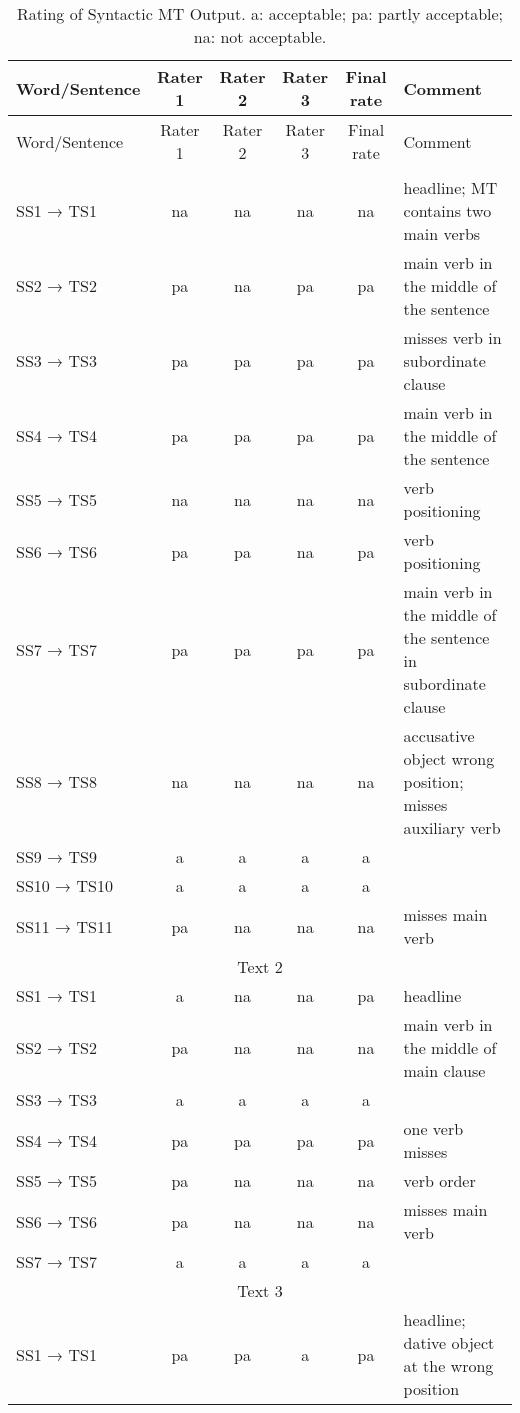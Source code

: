 {\footnotesize\begin{longtable}{l *{4}{c} p{3.75cm}}
\caption{Rating of Syntactic MT Output. a: acceptable; pa: partly acceptable; na: not acceptable.\label{tab:C:1}}\\
\lsptoprule
 Word\slash Sentence & Rater 1 & Rater 2 & Rater 3 & Final rate & Comment\\
\midrule\endfirsthead
\midrule
 Word\slash Sentence & Rater 1 & Rater 2 & Rater 3 & Final rate & Comment\\
 \midrule\endhead
\lspbottomrule\endlastfoot
\multicolumn{6}{c}{Text 1}\\
\midrule
 SS1 → TS1 & na & na & na & na & headline; MT contains two main verbs\\
 SS2 → TS2 & pa & na & pa & pa & main verb in the middle of the sentence\\
 SS3 → TS3 & pa & pa & pa & pa & misses verb in subordinate clause\\
 SS4 → TS4 & pa & pa & pa & pa & main verb in the middle of the sentence\\
 SS5 → TS5 & na & na & na & na & verb positioning\\
 SS6 → TS6 & pa & pa & na & pa & verb positioning\\
 SS7 → TS7 & pa & pa & pa & pa & main verb in the middle of the sentence in subordinate clause\\
 SS8 → TS8 & na & na & na & na & accusative object wrong position; misses auxiliary verb\\
 SS9 → TS9 & a & a & a & a & \\
 SS10 → TS10 & a & a & a & a & \\
 SS11 → TS11 & pa & na & na & na & misses main verb\\
 \midrule
\multicolumn{6}{c}{Text 2}\\
\midrule
 SS1 → TS1 & a & na & na & pa & headline\\
 SS2 → TS2 & pa & na & na & na & main verb in the middle of main clause\\
 SS3 → TS3 & a & a & a & a & \\
 SS4 → TS4 & pa & pa & pa & pa & one verb misses\\
 SS5 → TS5 & pa & na & na & na & verb order\\
 SS6 → TS6 & pa & na & na & na & misses main verb\\
 SS7 → TS7 & a & a & a & a & \\
 \midrule
\multicolumn{6}{c}{Text 3}\\
\midrule
 SS1 → TS1 & pa & pa & a & pa & headline; dative object at the wrong position\\

\end{longtable}}
